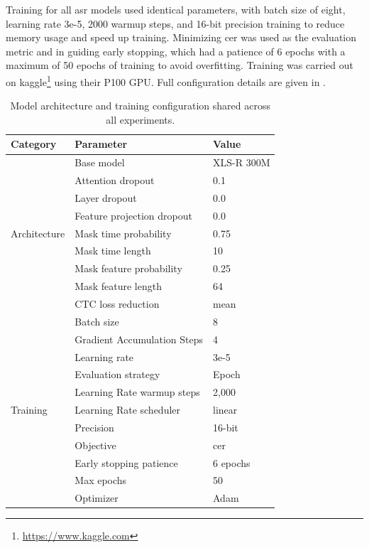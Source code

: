 \documentclass[thesis]{cluu}
\begin{document}
\label{training}Training for all \gls{asr} models used identical parameters, with batch size of eight, learning rate 3e-5, 2000 warmup steps, and 16-bit precision training to reduce memory usage and speed up training. Minimizing \gls{cer} was used as the evaluation metric and in guiding early stopping, which had a patience of 6 epochs with a maximum of 50 epochs of training to avoid overfitting. Training was carried out on kaggle\footnote{\url{https://www.kaggle.com}} using their P100 GPU. Full configuration details are given in .

\begin{table}[ht]
  \centering
  \caption{Model architecture and training configuration shared across all experiments.}
  \begin{tabular}{l|l|l}
    \textbf{Category} & \textbf{Parameter} & \textbf{Value} \\
    \hline
    \multirow{9}{*}{Architecture} & Base model & XLS-R 300M \\
                                  & Attention dropout & 0.1 \\
                                  & Layer dropout & 0.0 \\
                                  & Feature projection dropout & 0.0 \\
                                  & Mask time probability & 0.75 \\
                                  & Mask time length & 10 \\
                                  & Mask feature probability & 0.25 \\
                                  & Mask feature length & 64 \\
                                  & CTC loss reduction & mean \\
    \hline
    \multirow{11}{*}{Training}    & Batch size & 8 \\
                                  & Gradient Accumulation Steps & 4 \\
                                  & Learning rate & 3e-5 \\
                                  & Evaluation strategy & Epoch \\
                                  & Learning Rate warmup steps & 2,000 \\
                                  & Learning Rate scheduler & linear \\
                                  & Precision & 16-bit \\
                                  & Objective & \gls{cer} \\
                                  & Early stopping patience & 6 epochs \\
                                  & Max epochs & 50 \\
                                  & Optimizer & Adam \\
  \end{tabular}
  \label{tab:model_config}
\end{table}
\end{document}
